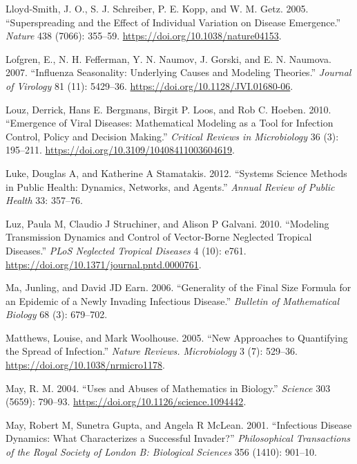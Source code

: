 \documentclass[
]{book}
\begin{document}
\leavevmode\hypertarget{ref-lloyd-smith05}{}%
Lloyd-Smith, J. O., S. J. Schreiber, P. E. Kopp, and W. M. Getz. 2005. ``Superspreading and the Effect of Individual Variation on Disease Emergence.'' \emph{Nature} 438 (7066): 355--59. \url{https://doi.org/10.1038/nature04153}.

\leavevmode\hypertarget{ref-lofgren07}{}%
Lofgren, E., N. H. Fefferman, Y. N. Naumov, J. Gorski, and E. N. Naumova. 2007. ``Influenza Seasonality: Underlying Causes and Modeling Theories.'' \emph{Journal of Virology} 81 (11): 5429--36. \url{https://doi.org/10.1128/JVI.01680-06}.

\leavevmode\hypertarget{ref-louz10}{}%
Louz, Derrick, Hans E. Bergmans, Birgit P. Loos, and Rob C. Hoeben. 2010. ``Emergence of Viral Diseases: Mathematical Modeling as a Tool for Infection Control, Policy and Decision Making.'' \emph{Critical Reviews in Microbiology} 36 (3): 195--211. \url{https://doi.org/10.3109/10408411003604619}.

\leavevmode\hypertarget{ref-luke12}{}%
Luke, Douglas A, and Katherine A Stamatakis. 2012. ``Systems Science Methods in Public Health: Dynamics, Networks, and Agents.'' \emph{Annual Review of Public Health} 33: 357--76.

\leavevmode\hypertarget{ref-luz10}{}%
Luz, Paula M, Claudio J Struchiner, and Alison P Galvani. 2010. ``Modeling Transmission Dynamics and Control of Vector-Borne Neglected Tropical Diseases.'' \emph{PLoS Neglected Tropical Diseases} 4 (10): e761. \url{https://doi.org/10.1371/journal.pntd.0000761}.

\leavevmode\hypertarget{ref-ma06}{}%
Ma, Junling, and David JD Earn. 2006. ``Generality of the Final Size Formula for an Epidemic of a Newly Invading Infectious Disease.'' \emph{Bulletin of Mathematical Biology} 68 (3): 679--702.

\leavevmode\hypertarget{ref-matthews05}{}%
Matthews, Louise, and Mark Woolhouse. 2005. ``New Approaches to Quantifying the Spread of Infection.'' \emph{Nature Reviews. Microbiology} 3 (7): 529--36. \url{https://doi.org/10.1038/nrmicro1178}.

\leavevmode\hypertarget{ref-may04}{}%
May, R. M. 2004. ``Uses and Abuses of Mathematics in Biology.'' \emph{Science} 303 (5659): 790--93. \url{https://doi.org/10.1126/science.1094442}.

\leavevmode\hypertarget{ref-may01}{}%
May, Robert M, Sunetra Gupta, and Angela R McLean. 2001. ``Infectious Disease Dynamics: What Characterizes a Successful Invader?'' \emph{Philosophical Transactions of the Royal Society of London B: Biological Sciences} 356 (1410): 901--10.
\end{document}
